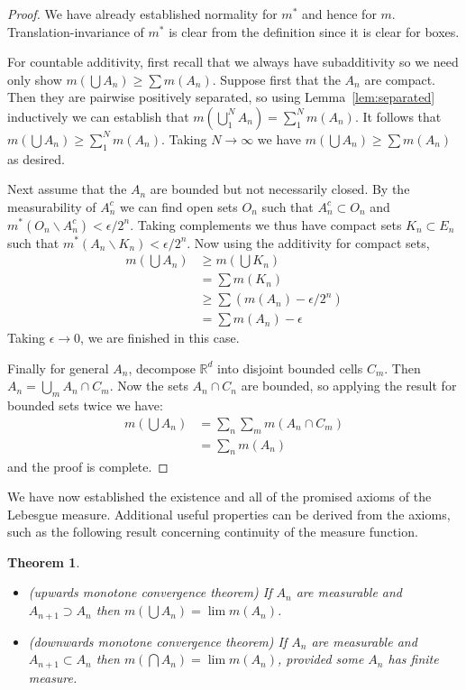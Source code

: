 \documentclass[10pt,oneside]{amsbook}
\renewcommand{\setminus}{\smallsetminus}
\newcommand{\RR}{{\mathbb R}}
\theoremstyle{definition}
\theoremstyle{plain}
\newtheorem{thm}{Theorem}[section]
\theoremstyle{definition}
\theoremstyle{remark}
\numberwithin{equation}{section}
\numberwithin{figure}{section}
\begin{document}
\begin{proof}
  We have already established normality for $m^*$ and hence for $m$. Translation-invariance of $m^*$ is clear from the definition since it is clear for boxes.

  For countable additivity, first recall that we always have subadditivity so we need only show $m(\bigcup A_n)\geq\sum m(A_n)$. Suppose first that the $A_n$ are compact. Then they are pairwise positively separated, so using Lemma~\ref{lem:separated} inductively we can establish that $m(\bigcup_1^N A_n)=\sum_1^N m(A_n)$. It follows that $m(\bigcup A_n)\geq\sum_1^Nm(A_n)$. Taking $N\to\infty$ we have $m(\bigcup A_n)\geq\sum m(A_n)$ as desired.

  Next assume that the $A_n$ are bounded but not necessarily closed. By the measurability of $A_n^c$ we can find open sets $O_n$ such that $A_n^c\subset O_n$ and $m^*(O_n\setminus A_n^c)<\epsilon/2^n$. Taking complements we thus have compact sets $K_n\subset E_n$ such that $m^*(A_n\setminus K_n)<\epsilon/2^n$. Now using the additivity for compact sets,
  \begin{align*}
    m(\bigcup A_n)&\geq m(\bigcup K_n)\\
                  &=\sum m(K_n)\\
                  &\geq\sum(m(A_n)-\epsilon/2^n)\\
                  &=\sum m(A_n)-\epsilon
  \end{align*}
  Taking $\epsilon\to0$, we are finished in this case.

  Finally for general $A_n$, decompose $\RR^d$ into disjoint bounded cells $C_m$. Then $A_n=\bigcup_m A_n\cap C_m$. Now the sets $A_n\cap C_n$ are bounded, so applying the result for bounded sets twice we have:
  \begin{align*}
    m(\bigcup A_n)&=\sum_n\sum_m m(A_n\cap C_m)\\
                  &=\sum_n m(A_n)
  \end{align*}
  and the proof is complete.
\end{proof}

We have now established the existence and all of the promised axioms of the Lebesgue measure. Additional useful properties can be derived from the axioms, such as the following result concerning continuity of the measure function.

\begin{thm}
  \label{thm:mct}
  \begin{itemize}
  \item (upwards monotone convergence theorem) If $A_n$ are measurable and $A_{n+1}\supset A_n$ then $m(\bigcup A_n)=\lim m(A_n)$.
  \item (downwards monotone convergence theorem) If $A_n$ are measurable and $A_{n+1}\subset A_n$ then $m(\bigcap A_n)=\lim m(A_n)$, provided some $A_n$ has finite measure.
  \end{itemize}
\end{thm}
\end{document}
